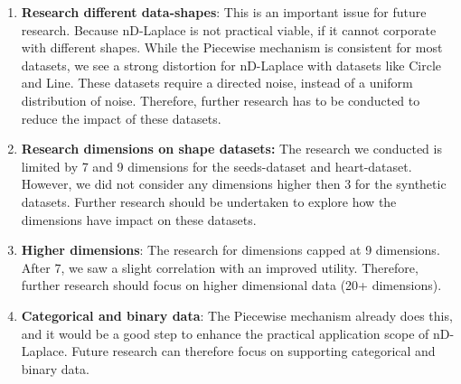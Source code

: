 \begin{enumerate}
    \item \textbf{Research different data-shapes}:  This is an important issue for future research. Because nD-Laplace is not practical viable, if it cannot corporate with different shapes. While the Piecewise mechanism is consistent for most datasets, we see a strong distortion for nD-Laplace with datasets like Circle and Line. 
These datasets require a directed noise, instead of a uniform distribution of noise. Therefore, further research has to be conducted to reduce the impact of these datasets.
\item \textbf{Research dimensions on shape datasets: } The research we conducted is limited by 7 and 9 dimensions for the seeds-dataset and heart-dataset. However, we did not consider any dimensions higher then 3 for the synthetic datasets. Further research should be undertaken to explore how the dimensions have impact on these datasets. 
\item \textbf{Higher dimensions}: The research for dimensions capped at 9 dimensions. After 7, we saw a slight correlation with an improved utility. Therefore, further research should focus on higher dimensional data (20+ dimensions). 
\item \textbf{Categorical and binary data}: The Piecewise mechanism already does this, and it would be a good step to enhance the practical application scope of nD-Laplace. Future research can therefore focus on supporting categorical and binary data.
\end{enumerate}

